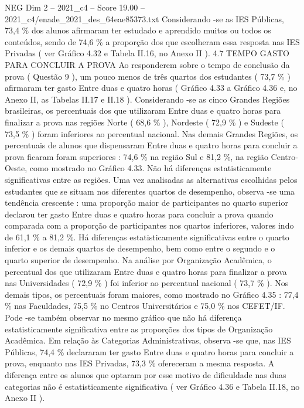 \begin{textsample}{NEG Dim 2 – 2021\_c4 – Score 19.00 – 2021\_c4/enade\_2021\_des\_64eae85373.txt}
Considerando -se as IES Públicas, 73,4 \% dos alunos afirmaram ter estudado e aprendido muitos ou todos os conteúdos, sendo de 74,6 \% a proporção dos que escolheram essa resposta nas IES Privadas ( ver Gráfico 4.32 e Tabela II.16, no Anexo II ). 4.7 TEMPO GASTO PARA CONCLUIR A PROVA Ao responderem sobre o tempo de conclusão da prova ( Questão 9 ), um pouco menos de três quartos dos estudantes ( 73,7 \% ) afirmaram ter gasto Entre duas e quatro horas ( Gráfico 4.33 a Gráfico 4.36 e, no Anexo II, as Tabelas II.17 e II.18 ).
Considerando -se as cinco Grandes Regiões brasileiras, os percentuais dos que utilizaram Entre duas e quatro horas para finalizar a prova nas regiões Norte ( 68,6 \% ), Nordeste ( 72,9 \% ) e Sudeste ( 73,5 \% ) foram inferiores ao percentual nacional.
Nas demais Grandes Regiões, os percentuais de alunos que dispensaram Entre duas e quatro horas para concluir a prova ficaram foram superiores : 74,6 \% na região Sul e 81,2 \%, na região Centro-Oeste, como mostrado no Gráfico 4.33.
Não há diferenças estatisticamente significativas entre as regiões.
Uma vez analisadas as alternativas escolhidas pelos estudantes que se situam nos diferentes quartos de desempenho, observa -se uma tendência crescente : uma proporção maior de participantes no quarto superior declarou ter gasto Entre duas e quatro horas para concluir a prova quando comparada com a proporção de participantes nos quartos inferiores, valores indo de 61,1 \% a 81,2 \%.
Há diferenças estatisticamente significativas entre o quarto inferior e os demais quartos de desempenho, bem como entre o segundo e o quarto superior de desempenho.
Na análise por Organização Acadêmica, o percentual dos que utilizaram Entre duas e quatro horas para finalizar a prova nas Universidades ( 72,9 \% ) foi inferior ao percentual nacional ( 73,7 \% ).
Nos demais tipos, os percentuais foram maiores, como mostrado no Gráfico 4.35 : 77,4 \% nas Faculdades, 75,5 \% no Centros Universitários e 75,0 \% nos CEFET/IF.
Pode -se também observar no mesmo gráfico que não há diferença estatisticamente significativa entre as proporções dos tipos de Organização Acadêmica.
Em relação às Categorias Administrativas, observa -se que, nas IES Públicas, 74,4 \% declararam ter gasto Entre duas e quatro horas para concluir a prova, enquanto nas IES Privadas, 73,3 \% ofereceram a mesma resposta.
A diferença entre os alunos que optaram por esse motivo de dificuldade nas duas categorias não é estatisticamente significativa ( ver Gráfico 4.36 e Tabela II.18, no Anexo II ).

\end{textsample}
